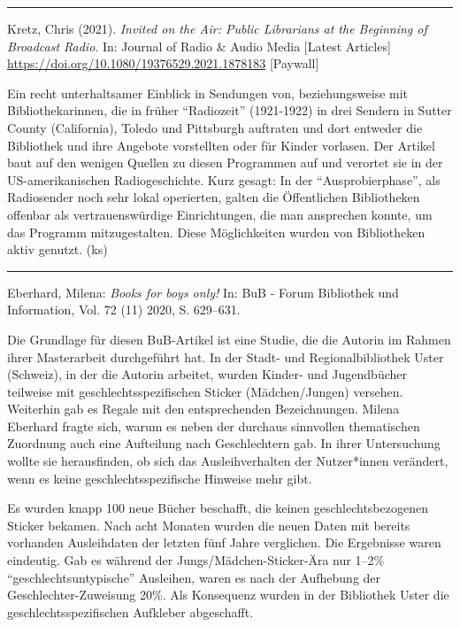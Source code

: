 \documentclass[a4paper,
fontsize=11pt,
oneside,
numbers=noperiodatend,
parskip=half-,
bibliography=totoc,
final
]{scrartcl}
\begin{document}
\begin{center}\rule{0.5\linewidth}{0.5pt}\end{center}

Kretz, Chris (2021). \emph{Invited on the Air: Public Librarians at the
Beginning of Broadcast Radio}. In: Journal of Radio \& Audio Media
{[}Latest Articles{]}
\url{https://doi.org/10.1080/19376529.2021.1878183} {[}Paywall{]}

Ein recht unterhaltsamer Einblick in Sendungen von, beziehungsweise mit
Bibliothekarinnen, die in früher \enquote{Radiozeit} (1921-1922) in drei
Sendern in Sutter County (California), Toledo und Pittsburgh auftraten
und dort entweder die Bibliothek und ihre Angebote vorstellten oder für
Kinder vorlasen. Der Artikel baut auf den wenigen Quellen zu diesen
Programmen auf und verortet sie in der US-amerikanischen
Radiogeschichte. Kurz gesagt: In der \enquote{Ausprobierphase}, als
Radiosender noch sehr lokal operierten, galten die Öffentlichen
Bibliotheken offenbar als vertrauenswürdige Einrichtungen, die man
ansprechen konnte, um das Programm mitzugestalten. Diese Möglichkeiten
wurden von Bibliotheken aktiv genutzt. (ks)

\begin{center}\rule{0.5\linewidth}{0.5pt}\end{center}

Eberhard, Milena: \emph{Books for boys only!} In: BuB - Forum Bibliothek
und Information, Vol. 72 (11) 2020, S. 629--631.

Die Grundlage für diesen BuB-Artikel ist eine Studie, die die Autorin im
Rahmen ihrer Masterarbeit durchgeführt hat. In der Stadt- und
Regionalbibliothek Uster (Schweiz), in der die Autorin arbeitet, wurden
Kinder- und Jugendbücher teilweise mit geschlechtsspezifischen Sticker
(Mädchen/Jungen) versehen. Weiterhin gab es Regale mit den
entsprechenden Bezeichnungen. Milena Eberhard fragte sich, warum es
neben der durchaus sinnvollen thematischen Zuordnung auch eine
Aufteilung nach Geschlechtern gab. In ihrer Untersuchung wollte sie
herausfinden, ob sich das Ausleihverhalten der Nutzer*innen verändert,
wenn es keine geschlechtsspezifische Hinweise mehr gibt.

Es wurden knapp 100 neue Bücher beschafft, die keinen
geschlechtsbezogenen Sticker bekamen. Nach acht Monaten wurden die neuen
Daten mit bereits vorhanden Ausleihdaten der letzten fünf Jahre
verglichen. Die Ergebnisse waren eindeutig. Gab es während der
Jungs/Mädchen-Sticker-Ära nur 1--2\% \enquote{geschlechtsuntypische}
Ausleihen, waren es nach der Aufhebung der Geschlechter-Zuweisung 20\%.
Als Konsequenz wurden in der Bibliothek Uster die
geschlechtsspezifischen Aufkleber abgeschafft.
\end{document}
